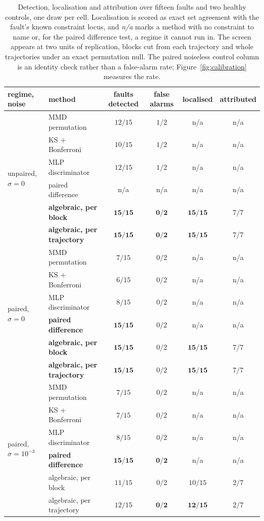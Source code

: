 \documentclass{article}
\begin{document}
\begin{table}[t]
\caption{Detection, localisation and attribution over fifteen faults and two
healthy controls, one draw per cell. Localisation is scored as exact set
agreement with the fault's known constraint locus, and \emph{n/a} marks a method
with no constraint to name or, for the paired difference test, a regime it
cannot run in. The screen appears at two units of replication, blocks cut from
each trajectory and whole trajectories under an exact permutation null. The
paired noiseless control column is an identity check rather than a false-alarm
rate; Figure~\ref{fig:calibration} measures the rate.}
\label{tab:e1}
\begin{center}
\small
\begin{tabular}{llcccc}
regime, noise & method & faults detected & false alarms & localised & attributed \\
\hline
\multirow{6}{*}{unpaired, $\sigma=0$}
  & MMD permutation      & $12/15$ & $1/2$ & n/a & n/a \\
  & KS $+$ Bonferroni    & $10/15$ & $1/2$ & n/a & n/a \\
  & MLP discriminator    & $12/15$ & $1/2$ & n/a & n/a \\
  & paired difference    & n/a     & n/a   & n/a & n/a \\
  & \textbf{algebraic, per block} & $\mathbf{15/15}$ & $\mathbf{0/2}$
    & $\mathbf{15/15}$ & $7/7$ \\
  & \textbf{algebraic, per trajectory} & $\mathbf{15/15}$ & $\mathbf{0/2}$
    & $\mathbf{15/15}$ & $7/7$ \\
\hline
\multirow{6}{*}{paired, $\sigma=0$}
  & MMD permutation      & $7/15$  & $0/2$ & n/a & n/a \\
  & KS $+$ Bonferroni    & $6/15$  & $0/2$ & n/a & n/a \\
  & MLP discriminator    & $8/15$  & $0/2$ & n/a & n/a \\
  & \textbf{paired difference} & $\mathbf{15/15}$ & $0/2$ & n/a & n/a \\
  & \textbf{algebraic, per block} & $\mathbf{15/15}$ & $0/2$
    & $\mathbf{15/15}$ & $7/7$ \\
  & \textbf{algebraic, per trajectory} & $\mathbf{15/15}$ & $0/2$
    & $\mathbf{15/15}$ & $7/7$ \\
\hline
\multirow{6}{*}{paired, $\sigma=10^{-3}$}
  & MMD permutation      & $7/15$  & $0/2$ & n/a & n/a \\
  & KS $+$ Bonferroni    & $7/15$  & $0/2$ & n/a & n/a \\
  & MLP discriminator    & $8/15$  & $0/2$ & n/a & n/a \\
  & \textbf{paired difference} & $\mathbf{15/15}$ & $\mathbf{0/2}$
    & n/a & n/a \\
  & algebraic, per block & $11/15$ & $0/2$ & $10/15$ & $2/7$ \\
  & algebraic, per trajectory & $12/15$ & $\mathbf{0/2}$
    & $\mathbf{12/15}$ & $2/7$ \\
\end{tabular}
\end{center}
\end{table}
\end{document}
